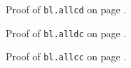 \blallcd
Proof of {\tt bl.allcd} on page \pageref{proof:bl.allcd}.

\blalldc
Proof of {\tt bl.alldc} on page \pageref{proof:bl.alldc}.

\blallcc
Proof of {\tt bl.allcc} on page \pageref{proof:bl.allcc}.

